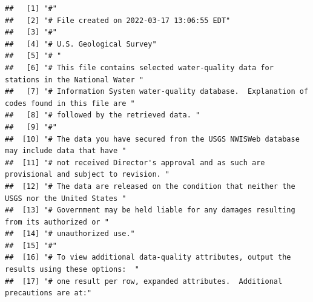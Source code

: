 \documentclass[
]{book}
\begin{document}
\begin{verbatim}
##   [1] "#"                                                                                                                                            
##   [2] "# File created on 2022-03-17 13:06:55 EDT"                                                                                                    
##   [3] "#"                                                                                                                                            
##   [4] "# U.S. Geological Survey"                                                                                                                     
##   [5] "# "                                                                                                                                           
##   [6] "# This file contains selected water-quality data for stations in the National Water "                                                         
##   [7] "# Information System water-quality database.  Explanation of codes found in this file are "                                                   
##   [8] "# followed by the retrieved data. "                                                                                                           
##   [9] "#"                                                                                                                                            
##  [10] "# The data you have secured from the USGS NWISWeb database may include data that have "                                                       
##  [11] "# not received Director's approval and as such are provisional and subject to revision. "                                                     
##  [12] "# The data are released on the condition that neither the USGS nor the United States "                                                        
##  [13] "# Government may be held liable for any damages resulting from its authorized or "                                                            
##  [14] "# unauthorized use."                                                                                                                          
##  [15] "#"                                                                                                                                            
##  [16] "# To view additional data-quality attributes, output the results using these options:  "                                                      
##  [17] "# one result per row, expanded attributes.  Additional precautions are at:"                                                                   

\end{verbatim}
\end{document}
